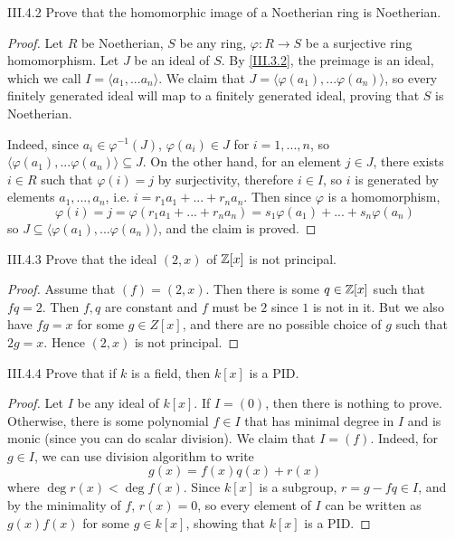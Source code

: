 \begin{problem}{III.4.2}
Prove that the homomorphic image of a Noetherian ring is Noetherian.
\end{problem}
\begin{proof}
Let $R$ be Noetherian, $S$ be any ring, $\varphi:R \to S$ be a surjective ring homomorphism. Let $J$ be an ideal of $S$. By \ref{III.3.2}, the preimage is an ideal, which we call $I = \langle a_1, ... a_n \rangle$. We claim that $J = \langle \varphi(a_1), ... \varphi(a_n) \rangle$, so every finitely generated ideal will map to a finitely generated ideal, proving that $S$ is Noetherian. 

Indeed, since $a_i \in \varphi^{-1}(J)$, $\varphi(a_i) \in J$ for $i = 1,...,n$, so $\langle \varphi(a_1), ... \varphi(a_n) \rangle \subseteq J$. On the other hand, for an element $j \in J$, there exists $i \in R$ such that $\varphi(i) = j$ by surjectivity, therefore $i \in I$, so $i$ is generated by elements $a_1, ... ,a_n$, i.e. $i = r_1a_1 + ... + r_na_n$. Then since $\varphi$ is a homomorphism, 
\[
\varphi(i) = j = \varphi(r_1a_1 + ... + r_na_n) = s_1\varphi(a_1) + ... + s_n\varphi(a_n)
\]
so $J \subseteq \langle \varphi(a_1), ... \varphi(a_n) \rangle$, and the claim is proved.
\end{proof}

\begin{problem}{III.4.3}
Prove that the ideal $(2,x)$ of $\mathbb{Z}[x]$ is not principal. 
\end{problem}
\begin{proof}
Assume that $(f) = (2,x)$. Then there is some $q \in \mathbb{Z}[x]$ such that $fq = 2$. Then $f,q$ are constant and $f$ must be $2$ since $1$ is not in it. But we also have $fg = x$ for some $g \in Z[x]$, and there are no possible choice of $g$ such that $2g = x$. Hence $(2,x)$ is not principal.
\end{proof}

\begin{problem}{III.4.4}
Prove that if $k$ is a field, then $k[x]$ is a PID.
\end{problem}
\begin{proof}
Let $I$ be any ideal of $k[x]$. If $I = (0)$, then there is nothing to prove. Otherwise, there is some polynomial $f\in I$ that has minimal degree in $I$ and is monic (since you can do scalar division). We claim that $I = (f)$. Indeed, for $g \in I$, we can use division algorithm to write
\[
g(x) = f(x)q(x) + r(x)  
\]  
where $\deg r(x) < \deg f(x)$. Since $k[x]$ is a subgroup, $r = g - fq \in I$, and by the minimality of $f$, $r(x) = 0$, so every element of $I$ can be written as $g(x)f(x)$ for some $g \in k[x]$, showing that $k[x]$ is a PID.
\end{proof}

